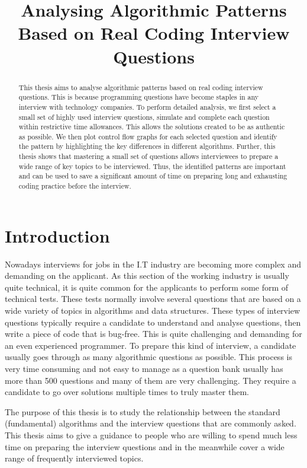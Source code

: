 \documentclass[conference]{IEEEtran}
\title{Analysing Algorithmic Patterns Based on Real Coding Interview Questions}
\author{
\IEEEauthorblockN{Ian Dempsey}
\IEEEauthorblockA{Computer Science Department, \\
Maynooth University,\\
Email: ian.dempsey.2013@mumail.ie}
\and
\IEEEauthorblockN{Supervisor: Hao Wu}
\IEEEauthorblockA{Computer Science Department, \\
Maynooth University,\\
Email: haowu@cs.nuim.ie}
}
\begin{document}
\tableofcontents
{}
\listoffigures
\listoftables
\newpage
\maketitle
{}
\newpage
{}
\begin{abstract}
This thesis aims to analyse algorithmic patterns based on real coding interview questions. This is because programming questions have become staples in any interview with technology companies. To perform detailed analysis, we first select a small set of highly used interview questions, simulate and complete each question within restrictive time allowances. This allows the solutions created to be as authentic as possible. We then plot control flow graphs for each selected question and identify the pattern by highlighting the key differences in different algorithms. Further, this thesis shows that mastering a small set of questions allows interviewees to prepare a wide range of key topics to be interviewed. Thus, the identified patterns are important and can be used to save a significant amount of time on preparing long and exhausting coding practice before the interview.
\end{abstract}
\section{Introduction}
\label{sec:intro}
Nowadays interviews for jobs in the I.T industry are becoming more complex and demanding on the applicant. As this section of the working industry is usually quite technical, it is quite common for the applicants to perform some form of technical tests. These tests normally involve several questions that are based on a wide variety of topics in algorithms and data structures. These types of interview questions typically require a candidate to understand and analyse questions, then write a piece of code that is bug-free. This is quite challenging and demanding for an even experienced programmer. To prepare this kind of interview, a candidate usually goes through as many algorithmic questions as possible. This process is very time consuming and not easy to manage as a question bank usually has more than 500 questions and many of them are very challenging. They require a candidate to go over solutions multiple times to truly master them.

The purpose of this thesis is to study the relationship between the standard (fundamental) algorithms and the interview questions that are commonly asked. This thesis aims to give a guidance to people who are willing to spend much less time on preparing the interview questions and in the meanwhile cover a wide range of frequently interviewed topics.
\end{document}
